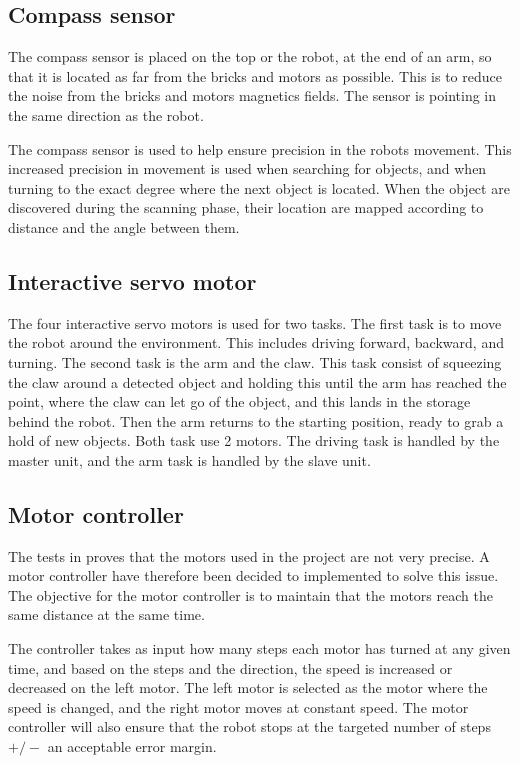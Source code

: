 \subsection{Compass sensor}
The compass sensor is placed on the top or the robot, at the end of an arm, so that it is located as far from the bricks and motors as possible. This is to reduce the noise from the bricks and motors magnetics fields. The sensor is pointing in the same direction as the robot.

The compass sensor is used to help ensure precision in the robots movement. This increased precision in movement is used when searching for objects, and when turning to the exact degree where the next object is located. When the object are discovered during the scanning phase, their location are mapped according to distance and the angle between them.

\subsection{Interactive servo motor}
The four interactive servo motors is used for two tasks. The first task is to move the robot around the environment. This includes driving forward, backward, and turning. The second task is the arm and the claw. This task consist of squeezing the claw around a detected object and holding this until the arm has reached the point, where the claw can let go of the object, and this lands in the storage behind the robot. Then the arm returns to the starting position, ready to grab a hold of new objects. Both task use 2 motors. The driving task is handled by the master unit, and the arm task is handled by the slave unit.

\subsection{Motor controller}
The tests in  proves that the motors used in the project are not very precise. A motor controller have therefore been decided to implemented to solve this issue. The objective for the motor controller is to maintain that the motors reach the same distance at the same time. 

The controller takes as input how many steps each motor has turned at any given time, and based on the steps and the direction, the speed is increased or decreased on the left motor. The left motor is selected as the motor where the speed is changed, and the right motor moves at constant speed. The motor controller will also ensure that the robot stops at the targeted number of steps $+/-$ an acceptable error margin.

